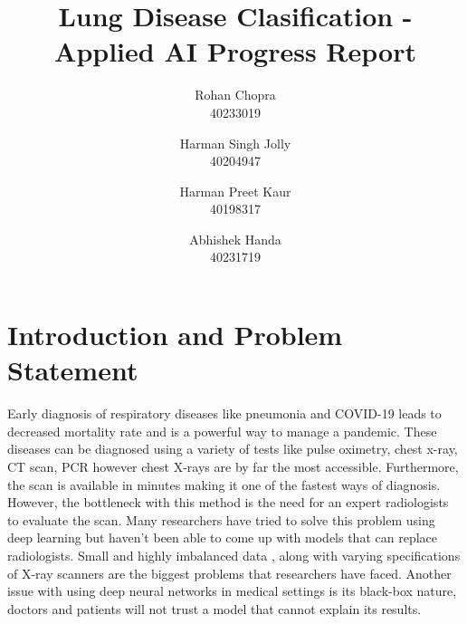 \documentclass[10pt,twocolumn,letterpaper]{article}
\def\subName{Applied AI }
\begin{document}
\def\cvprPaperID{Group-Q} %
\def\confName{COMP6721}
\def\confYear{2022}

\title{Lung Disease Clasification - \subName Progress Report}
\author{Rohan Chopra\\
\small 40233019\\
\and
Harman Singh Jolly\\
\small 40204947\\
\and
Harman Preet Kaur\\
\small 40198317\\
\and
Abhishek Handa\\
\small 40231719\\
}
\maketitle
\section{Introduction and Problem Statement}
\label{sec:intro}

Early diagnosis of respiratory diseases like pneumonia and COVID-19 leads to decreased mortality rate \cite{daniel2016time} and is a powerful way to manage a pandemic\cite{xu2020facile}. These diseases can be diagnosed using a variety of tests like pulse oximetry, chest x-ray, CT scan\cite{mattsmith2022},  PCR\cite{akhtar1996pcr} however chest X-rays are by far the most accessible\cite{frija2021improve}. Furthermore, the scan is available in minutes making it one of the fastest ways of diagnosis\cite{healthwise2021}. However, the bottleneck with this method is the need for an expert radiologists to evaluate the scan\cite{mehrotra2009radiologists}. Many researchers have tried to solve this problem using deep learning \cite{wang2021deep} but haven't been able to come up with models that can replace radiologists. Small \cite{guefrechi2021deep} and highly imbalanced data \cite{wang2021deep}, along with varying specifications of X-ray scanners are the biggest problems \cite{melissarohman2018} that researchers have faced. Another issue with using deep neural networks in medical settings is its black-box nature\cite{paulblazek2022}, doctors and patients will not trust a model that cannot explain its results\cite{aleksandra2019}. 
\end{document}
